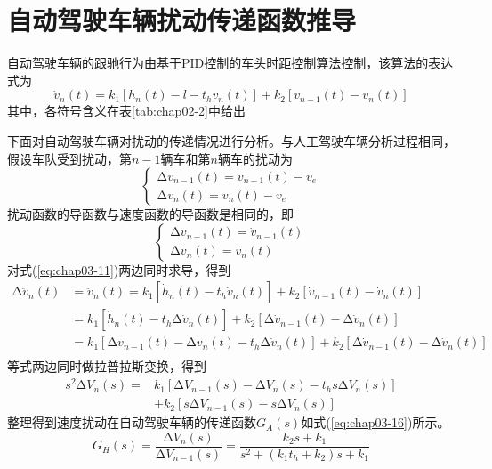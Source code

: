 \section{自动驾驶车辆扰动传递函数推导}

自动驾驶车辆的跟驰行为由基于PID控制的车头时距控制算法控制，该算法的表达式为
\begin{equation}
  \dot{v}_n(t) = k_1 \left[ h_n(t) - l - t_hv_n(t) \right] + k_2 \left[ v_{n-1}(t) - v_n(t) \right]
  \label{eq:chap03-11}
\end{equation}
其中，各符号含义在表\ref{tab:chap02-2}中给出

下面对自动驾驶车辆对扰动的传递情况进行分析。与人工驾驶车辆分析过程相同，假设车队受到扰动，第$n-1$辆车和第$n$辆车的扰动为
\begin{equation}
  \begin{cases}
    \increment{v_{n-1}(t)} = v_{n-1}(t) - v_e \\
    \increment{v_n(t)} = v_n(t) - v_e
  \end{cases}
  \label{eq:chap03-12}
\end{equation}
扰动函数的导函数与速度函数的导函数是相同的，即
\begin{equation}
  \begin{cases}
    \increment{\dot{v}_{n-1}(t)} = \dot{v}_{n-1}(t) \\
    \increment{\dot{v}_n(t)} = \dot{v}_n(t)
  \end{cases}
  \label{eq:chap03-13}
\end{equation}
对式(\ref{eq:chap03-11})两边同时求导，得到
\begin{equation}
  \begin{aligned}
    \increment{\ddot{v}}_n(t) &= \ddot{v}_n(t) = k_1 [\dot{h}_n(t) - t_h\dot{v}_n(t)]
                              + k_2 [\dot{v}_{n-1}(t) - \dot{v}_n(t)] \\
    &= k_1 [\dot{h}_n(t) - t_h \increment{\dot{v}_n(t)}]
       + k_2 [\increment{\dot{v}_{n-1}(t)} - \increment{\dot{v}_n(t)}] \\
    &= k_1 [\increment{v}_{n-1}(t) - \increment{v}_n(t) - t_h \increment{\dot{v}_n(t)}]
       + k_2 [\increment{\dot{v}_{n-1}(t)} - \increment{\dot{v}_n(t)}] \\
  \end{aligned}
  \label{eq:chap03-14}
\end{equation}
等式两边同时做拉普拉斯变换，得到
\begin{equation}
  \begin{aligned}
    s^2\increment{V}_n(s) = &k_1[ \increment{V_{n-1}(s)} - \increment{V_{n}(s)} - t_hs\increment{V_{n}(s)}] \\
                            &+ k_2 [ s\increment{V_{n-1}(s)} - s\increment{V_n(s)} ]
  \end{aligned}
  \label{eq:chap03-15}
\end{equation}
整理得到速度扰动在自动驾驶车辆的传递函数$G_{A}(s)$如式(\ref{eq:chap03-16})所示。
\begin{equation}
  G_{H}(s) = \frac{\increment{V_{n}(s)}}{\increment{V_{n-1}(s)}} = 
  \frac{k_2s + k_1}{s^2 + (k_1t_h + k_2) s + k_1}
  \label{eq:chap03-16}
\end{equation}

